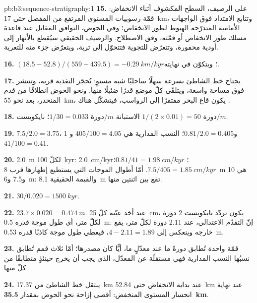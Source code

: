 \begin{solution}{pb:b3:sequence-stratigraphy:1}
\textbf{15.} على الرصيف، السطح المكشوف أثناء الانخفاض: قمّة
رسوبيات المستوى المرتفع من المفصل حتى \qty{17}{km}، وتتابع الامتداد فوق
الواجهات الأمامية المتدرّجة الهبوط لطور الانخفاض؛ وفي الحوض، التوافق المقابل
عند قاعدة مسلك طور الانخفاض أو قمّته، وفق الاصطلاح. والرصيف
الحقيقي سيُقطع بالأنهار إلى أودية محفورة، وتتعرّض للتجوية فتتحوّل إلى تربة،
ويتعرّض جزء منه للتعرية.

\textbf{16.} $(18.5 - 52.8)/(559 - 439.5) = \qty{-0.29}{km/kyr}$؛ ويتكوّن
 في نهايته.

\textbf{17.} يجتاح خط الشاطئ بسرعة سهلًا ساحليًا شبه مستوٍ:
تُحجَز التغذية قربه، وتنتشر فوق مساحة واسعة، ويتلقّى كلّ موضع
قدرًا ضئيلًا منها. ونحو الحوض انطلاقًا من قدم المنحدر، بعد نحو \qty{55}{km}، يكون
قاع البحر مفتقرًا إلى الرواسب، فيتشكّل هناك .

\textbf{18.} الاستبانة $1/30 = \num{0.033}\text{ دورة}/\unit{m}$؛ نايكويست $1/(2\times
0.01) = \num{50}\text{ دورة}/\unit{m}$.

\textbf{19.} $7.5/2.0 = 3.75$، 1 و$0.81/2.0 = 0.405$؛ النسب المدارية
هي $405/100 = 4.05$ و$41/100 = 0.41$.

\textbf{20.} \qty{2.0}{m} لكلّ \qty{100}{kyr}: \qty{2.0}{cm/kyr}؛ $0.81/41 =
\qty{1.98}{cm/kyr}$؛ $7.5/405 = \qty{1.85}{cm/kyr}$. أمّا أطوال الموجات التي
يستطيع  إظهارها قرب \qty{8}{m} هي 10 و7.5 و\qty{6}{m}: والقيمة
الحقيقية \qty{8.1}{m} تقع بين اثنتين منها.

\textbf{21.} $30/0.020 = \qty{1500}{kyr}$.

\textbf{22.} $23.7\times0.020 = \qty{0.474}{m}$. عند أخذ عيّنة كلّ
\qty{25}{cm}، يكون تردّد نايكويست 2 دورة لكلّ متر، أي طول موجة قدره
\qty{0.5}{m}: إنّ التقدّم الاعتدالي، عند 2.11 دورة لكلّ متر، يقع خارجه وينعكس
إلى $4 - 2.11 = 1.89$، فيعطي طول موجة كاذبًا قدره \qty{0.53}{m}.

\textbf{23.} قمّة واحدة تُطابق دورةً ما عند معدّلٍ ما، أيًّا كان
مصدرها؛ أمّا ثلاث قمم تُطابق نسبُها النسب المدارية فهي مستقلّة عن
المعدّل، الذي يجب أن يخرج حينئذٍ متطابقًا من كلّ منها.

\textbf{24.} ينتقل خط الشاطئ من \qty{17.37}{km} عند بداية
الانخفاض حتى \qty{52.84}{km} عند نهاية انحسار المستوى المنخفض: أقصى
إزاحة نحو الحوض بمقدار \textbf{\qty[text-series-to-math=true]{35.5}{km}}.
\end{solution}
